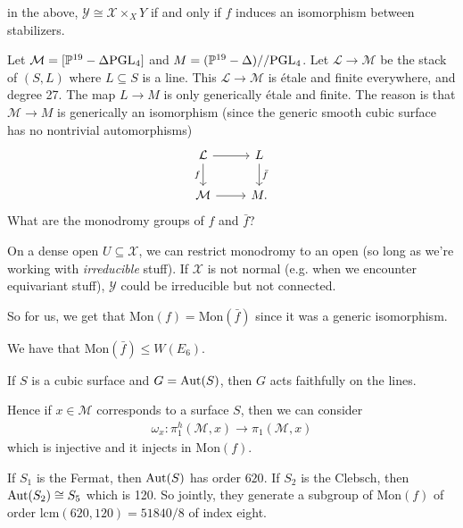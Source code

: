 \documentclass[11pt]{amsart}
\providecommand{\lcm}{\mathrm{lcm}}
\providecommand{\Mon}{\mathrm{Mon}}
\begin{document}
\begin{claim} in the above, $\mathcal{Y} \cong \mathcal{X} \times_{X} Y$ if and only if $f$ induces an isomorphism between stabilizers.
\end{claim}

\begin{example} Let $\mathcal{M} = [\mathbb{P}^{19}- \Delta\mathrm{PGL}_4]$ and $M = (\mathbb{P}^{19}-\Delta)//\mathrm{PGL}_4$. Let $\mathcal{L} \to \mathcal{M}$ be the stack of $(S,L)$ where $L \subseteq S$ is a line. This $\mathcal{L} \to \mathcal{M}$ is \'etale and finite everywhere, and degree 27. The map $L \to M$ is only generically \'etale and finite. The reason is that $\mathcal{M} \to M$ is generically an isomorphism (since the generic smooth cubic surface has no nontrivial automorphisms)
\[\begin{tikzcd}
    \mathcal{L}\rar\dar["f" left] & L\dar["\bar{f}" right]\\
    \mathcal{M}\rar & M.
\end{tikzcd} \]
What are the monodromy groups of $f$ and $\bar{f}$?
\end{example}

\begin{fact} On a dense open $U \subseteq \mathcal{X}$, we can restrict monodromy to an open (so long as we're working with \textit{irreducible} stuff). If $\mathcal{X}$ is not normal (e.g. when we encounter equivariant stuff), $\mathcal{Y}$ could be irreducible but not connected.
\end{fact}

So for us, we get that $\Mon(f) = \Mon(\bar{f})$ since it was a generic isomorphism.

\begin{fact} We have that $\Mon(\bar{f}) \le W(E_6)$.
\end{fact}

\begin{fact} If $S$ is a cubic surface and $G = \mathrm{Aut}(S)$, then $G$ acts faithfully on the lines.
\end{fact}

Hence if $x\in \mathcal{M}$ corresponds to a surface $S$, then we can consider
\begin{align*}
    \omega_x \colon \pi_1^h(\mathcal{M},x) \to \pi_1(\mathcal{M},x)
\end{align*}
which is injective and it injects in $\Mon(f)$.

If $S_1$ is the Fermat, then $\mathrm{Aut}(S)$ has order $620$. If $S_2$ is the Clebsch, then $\mathrm{Aut}(S_2)\cong S_5$ which is 120. So jointly, they generate a subgroup of $\Mon(f)$ of order $\lcm(620,120) = 51840/8$ of index eight.
\end{document}
